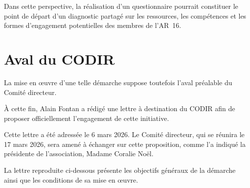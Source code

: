 \documentclass[12pt,a4paper]{article}
\begin{document}
Dans cette perspective, la réalisation d'un questionnaire pourrait constituer
le point de départ d'un diagnostic partagé sur les ressources, les compétences
et les formes d'engagement potentielles des membres de l'AR~16.

\section{Aval du CODIR}

La mise en œuvre d'une telle démarche suppose toutefois l'aval préalable
du Comité directeur.

À cette fin, Alain Fontan a rédigé une lettre à destination du CODIR afin
de proposer officiellement l'engagement de cette initiative.

Cette lettre a été adressée le 6 mars 2026. Le Comité directeur, qui se
réunira le 17 mars 2026, sera amené à échanger sur cette proposition, comme
l'a indiqué la présidente de l'association, Madame Coralie Noël.

La lettre reproduite ci-dessous présente les objectifs généraux de la
démarche ainsi que les conditions de sa mise en œuvre.
\end{document}
